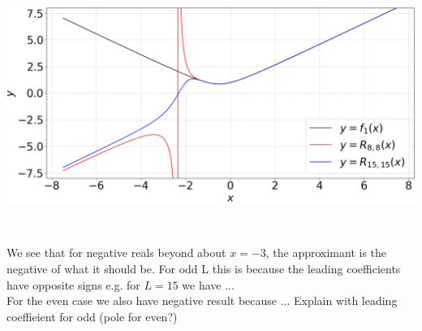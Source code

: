 \documentclass[12pt, a4paper]{article}
\begin{document}
\begin{minipage}{\textwidth}
	\centering
	\includegraphics[width=\linewidth]{q5_fig5}

	\vspace{-0.2cm}

	\label{q5_fig5}
\end{minipage}
\\

\vspace{0.3cm}

We see that for negative reals beyond about $x=-3$, the approximant is the negative 
of what it should be. For odd L this is because the leading coefficients have 
opposite signs e.g. for $L = 15$ we have ...\\

For the even case we also have negative result because ...
Explain with leading coeffieient for odd (pole for even?)
\end{document}
